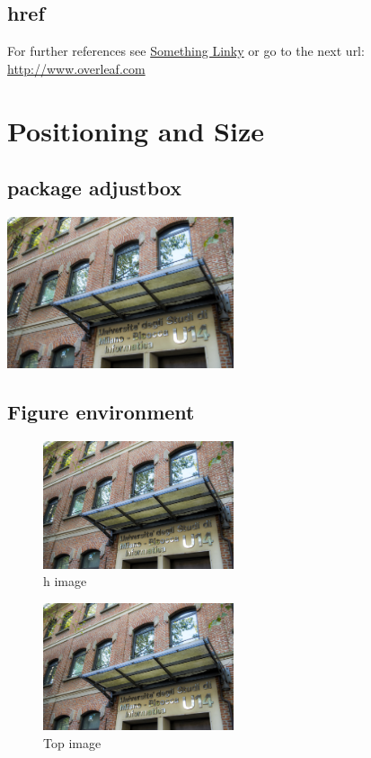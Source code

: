 \documentclass[a4paper, oneside]{book}
\begin{document}
\section{href}
For further references see \href{http://www.overleaf.com}{Something Linky} 
or go to the next url: \url{http://www.overleaf.com}

\chapter{Positioning and Size}

\section{package adjustbox}
\includegraphics[width=0.5\textwidth, right]{u14.jpg}

\section{Figure environment}

\begin{figure}[h]
\includegraphics[width=0.5\textwidth, inner]{u14}
\caption{h image}
\label{fig:figure4}
\end{figure}

\begin{figure}[t]
\includegraphics[width=0.5\textwidth, inner]{u14}
\caption{Top image}
\label{fig:figure2}
\end{figure}
\end{document}
